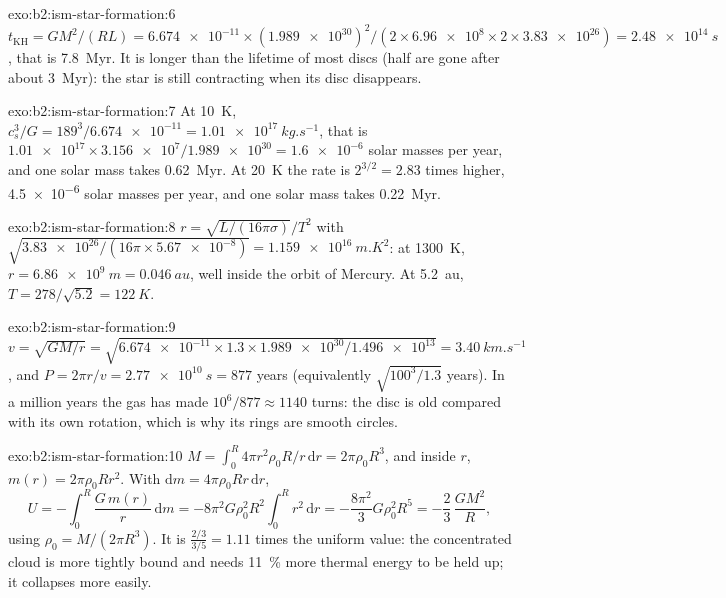 \begin{solution}{exo:b2:ism-star-formation:6}
$t_{\mathrm{KH}} = GM^2/(RL) = \num{6.674e-11}\times(\num{1.989e30})^2/(2\times
\num{6.96e8}\times2\times\num{3.83e26}) = \qty{2.48e14}{s}$, that is
\qty{7.8}{Myr}. It is longer than the lifetime of most discs (half are gone after
about \qty{3}{Myr}): the star is still contracting when its disc disappears.
\end{solution}

\begin{solution}{exo:b2:ism-star-formation:7}
At \qty{10}{K}, $c_s^3/G = 189^3/\num{6.674e-11} = \qty{1.01e17}{kg.s^{-1}}$, that is
$\num{1.01e17}\times\num{3.156e7}/\num{1.989e30} = \num{1.6e-6}$ solar masses per
year, and one solar mass takes \qty{0.62}{Myr}. At \qty{20}{K} the rate is
$2^{3/2} = 2.83$ times higher, \num{4.5e-6} solar masses per year, and one solar
mass takes \qty{0.22}{Myr}.
\end{solution}

\begin{solution}{exo:b2:ism-star-formation:8}
$r = \sqrt{L/(16\pi\sigma)}/T^2$ with $\sqrt{\num{3.83e26}/(16\pi\times\num{5.67e-8})}
= \qty{1.159e16}{m.K^2}$: at \qty{1300}{K}, $r = \qty{6.86e9}{m} = \qty{0.046}{au}$,
well inside the orbit of Mercury. At \qty{5.2}{au}, $T = 278/\sqrt{5.2} = \qty{122}{K}$.
\end{solution}

\begin{solution}{exo:b2:ism-star-formation:9}
$v = \sqrt{GM/r} = \sqrt{\num{6.674e-11}\times1.3\times\num{1.989e30}/\num{1.496e13}}
= \qty{3.40}{km.s^{-1}}$, and $P = 2\pi r/v = \qty{2.77e10}{s} = 877$ years
(equivalently $\sqrt{100^3/1.3}$ years). In a million years the gas has made
$10^6/877 \approx \num{1140}$ turns: the disc is old compared with its own rotation,
which is why its rings are smooth circles.
\end{solution}

\begin{solution}{exo:b2:ism-star-formation:10}
$M = \int_0^R 4\pi r^2\rho_0R/r\,\mathrm dr = 2\pi\rho_0R^3$, and inside $r$,
$m(r) = 2\pi\rho_0Rr^2$. With $\mathrm dm = 4\pi\rho_0Rr\,\mathrm dr$,
\[
  U = -\int_0^R \frac{G\,m(r)}{r}\,\mathrm dm
    = -8\pi^2G\rho_0^2R^2\int_0^R r^2\,\mathrm dr = -\frac{8\pi^2}{3}G\rho_0^2R^5
    = -\frac23\,\frac{GM^2}{R},
\]
using $\rho_0 = M/(2\pi R^3)$. It is $\tfrac{2/3}{3/5} = 1.11$ times the uniform value:
the concentrated cloud is more tightly bound and needs \qty{11}{\percent} more
thermal energy to be held up; it collapses more easily.
\end{solution}

